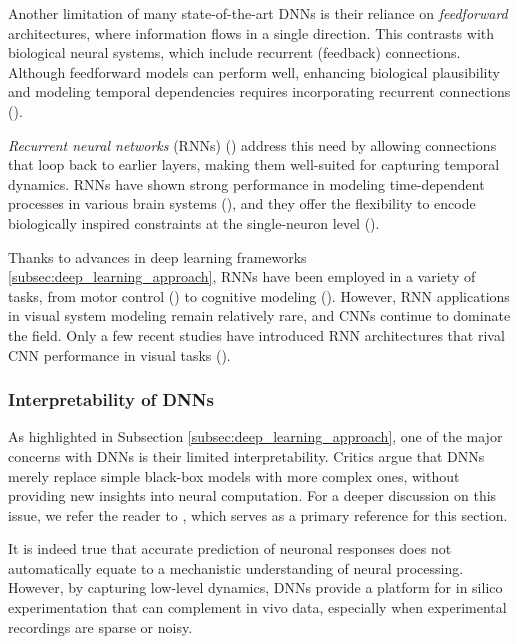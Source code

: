 Another limitation of many state-of-the-art DNNs is their reliance on \emph{feedforward} architectures, where information flows in a single direction. This contrasts with biological neural systems, which include recurrent (feedback) connections. Although feedforward models can perform well, enhancing biological plausibility and modeling temporal dependencies requires incorporating recurrent connections (\citet{Kafaligonul2015rnn, shou2010functional, kar2019evidence}).

\emph{Recurrent neural networks} (RNNs) (\citet{medsker2001recurrent}) address this need by allowing connections that loop back to earlier layers, making them well-suited for capturing temporal dynamics. RNNs have shown strong performance in modeling time-dependent processes in various brain systems (\citet{mante2013context, song2016excinhrec}), and they offer the flexibility to encode biologically inspired constraints at the single-neuron level (\citet{mante2013context, masse2019circuit, kim2019rnnframework}).

Thanks to advances in deep learning frameworks \ref{subsec:deep_learning_approach}, RNNs have been employed in a variety of tasks, from motor control (\citet{sussillo2015neural, saxena2022motor}) to cognitive modeling (\citet{masse2019circuit, goudar2023schema}). However, RNN applications in visual system modeling remain relatively rare, and CNNs continue to dominate the field. Only a few recent studies have introduced RNN architectures that rival CNN performance in visual tasks (\citet{NEURIPS2024_f536d569}).

\subsubsection{Interpretability of DNNs}
\label{subsubsec:interpretability_dnn}

As highlighted in Subsection \ref{subsec:deep_learning_approach}, one of the major concerns with DNNs is their limited interpretability. Critics argue that DNNs merely replace simple black-box models with more complex ones, without providing new insights into neural computation. For a deeper discussion on this issue, we refer the reader to \citet{Kriegeskorte2015dnn}, which serves as a primary reference for this section.

It is indeed true that accurate prediction of neuronal responses does not automatically equate to a mechanistic understanding of neural processing. However, by capturing low-level dynamics, DNNs provide a platform for in silico experimentation that can complement in vivo data, especially when experimental recordings are sparse or noisy.

